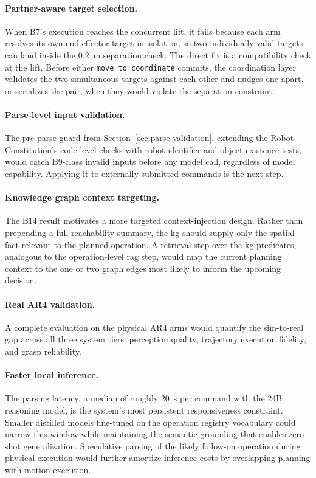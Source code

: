 \paragraph{Partner-aware target selection.} When B7’s execution reaches the concurrent lift, it fails because each arm resolves its own end-effector target in isolation, so two individually valid targets can land inside the 0.2~m separation check. The direct fix is a compatibility check at the lift. Before either \texttt{move\_to\_coordinate} commits, the coordination layer validates the two simultaneous targets against each other and nudges one apart, or serializes the pair, when they would violate the separation constraint.

\paragraph{Parse-level input validation.} The pre-parse guard from Section~\ref{sec:parse-validation}, extending the Robot Constitution’s code-level checks with robot-identifier and object-existence tests, would catch B9-class invalid inputs before any model call, regardless of model capability. Applying it to externally submitted commands is the next step.

\paragraph{Knowledge graph context targeting.} The B14 result motivates a more targeted context-injection design. Rather than prepending a full reachability summary, the \gls{kg} should supply only the spatial fact relevant to the planned operation. A retrieval step over the \gls{kg} predicates, analogous to the operation-level \gls{rag} step, would map the current planning context to the one or two graph edges most likely to inform the upcoming decision.

\paragraph{Real AR4 validation.} A complete evaluation on the physical AR4 arms would quantify the sim-to-real gap across all three system tiers: perception quality, trajectory execution fidelity, and grasp reliability.

\paragraph{Faster local inference.} The parsing latency, a median of roughly 20~s per command with the 24B reasoning model, is the system’s most persistent responsiveness constraint. Smaller distilled models fine-tuned on the operation registry vocabulary could narrow this window while maintaining the semantic grounding that enables zero-shot generalization. Speculative parsing of the likely follow-on operation during physical execution would further amortize inference costs by overlapping planning with motion execution.


